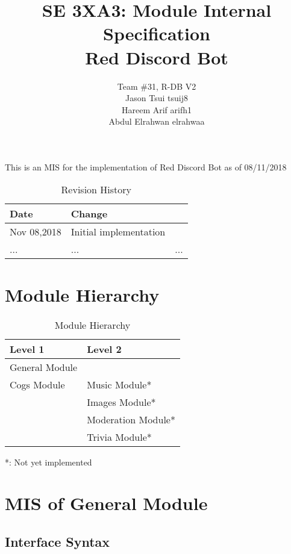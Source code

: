 \documentclass[12,english]{article}
\title{SE 3XA3: Module Internal Specification\\Red Discord Bot}
\author{Team \#31, R-DB V2
		\\ Jason Tsui tsuij8
		\\ Hareem Arif arifh1
		\\ Abdul Elrahwan elrahwaa
}
\begin{document}
\maketitle
This is an MIS for the implementation of Red Discord Bot as of 08/11/2018

\begin{table}[hp]
\caption{Revision History} \label{TblRevisionHistory}
\begin{tabularx}{\textwidth}{llX}
\toprule
\textbf{Date}  & \textbf{Change}\\
\midrule
Nov 08,2018 & Initial implementation\\
... & ... & ...\\
\bottomrule
\end{tabularx}
\end{table}


\date{}


\newpage
\tableofcontents
\newpage


\section{Module Hierarchy}
\begin{table}[!htbp]
        \begin{tabular}{ll}
        \toprule
        Level 1 & Level 2 \\
        \midrule
        General Module & \\
         \midrule
        Cogs Module & Music Module* \\
        & Images Module*\\
        & Moderation Module*\\
        & Trivia Module*\\ 
        \bottomrule
        \end{tabular}
        \caption{Module Hierarchy}
       *: Not yet implemented
        \makeatletter
           \def\rulecolor#1#{\CT@arc{#1}}
           \def\CT@arc#1#2{%
           \ifdim\baselineskip=\z@\noalign\fi
           {\gdef\CT@arc@{\color#1{#2}}}}
           \let\CT@arc@\relax
        \makeatother
        \label{Table 1}
        \end{table}
        
\section{MIS of General Module}
		\subsection{Interface Syntax}
\end{document}
